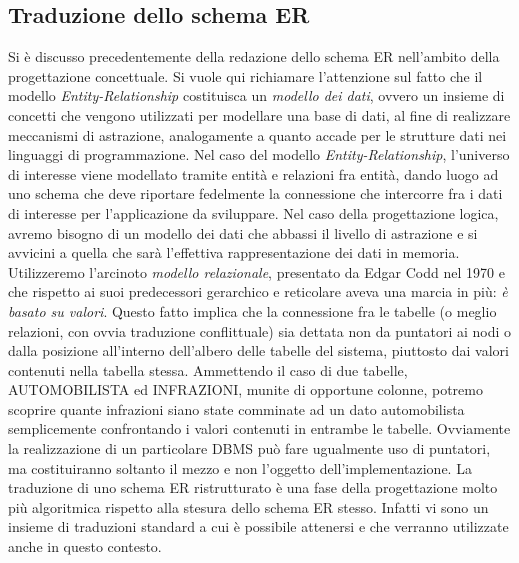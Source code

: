 \documentclass[12pt,a4paper,onecolumn,x11names]{article}
\begin{document}
			

		
\subsection{Traduzione dello schema ER}

	\begin{flushleft}
		Si è discusso precedentemente della redazione dello schema ER nell'ambito della progettazione concettuale. Si vuole qui richiamare l'attenzione sul fatto che il modello \textit{Entity-Relationship} costituisca un \textit{modello dei dati}, ovvero un insieme di concetti che vengono utilizzati per modellare una base di dati, al fine di realizzare meccanismi di astrazione, analogamente a quanto accade per le strutture dati nei linguaggi di programmazione.\newline
		Nel caso del modello \textit{Entity-Relationship}, l'universo di interesse viene modellato tramite entità e relazioni fra entità, dando luogo ad uno schema che deve riportare fedelmente la connessione che intercorre fra i dati di interesse per l'applicazione da sviluppare.\newline
		Nel caso della progettazione logica, avremo bisogno di un modello dei dati che abbassi il livello di astrazione e si avvicini a quella che sarà l'effettiva rappresentazione dei dati in memoria. Utilizzeremo l'arcinoto \textit{modello relazionale}, presentato da Edgar Codd nel 1970 e che rispetto ai suoi predecessori gerarchico e reticolare aveva una marcia in più: \textit{è basato su valori}. Questo fatto implica che la connessione fra le tabelle (o meglio relazioni, con ovvia traduzione conflittuale) sia dettata non da puntatori ai nodi o dalla posizione all'interno dell'albero delle tabelle del sistema, piuttosto dai valori contenuti nella tabella stessa. Ammettendo il caso di due tabelle, \textsf{AUTOMOBILISTA} ed \textsf{INFRAZIONI}, munite di opportune colonne, potremo scoprire quante infrazioni siano state comminate ad un dato automobilista semplicemente confrontando i valori contenuti in entrambe le tabelle. Ovviamente la realizzazione di un particolare DBMS può fare ugualmente uso di puntatori, ma costituiranno soltanto il mezzo e non l'oggetto dell'implementazione.\newline\newline
		La traduzione di uno schema ER ristrutturato è una fase della progettazione molto più algoritmica rispetto alla stesura dello schema ER stesso. Infatti vi sono un insieme di traduzioni standard a cui è possibile attenersi e che verranno utilizzate anche in questo contesto.\newline

\end{flushleft}
\end{document}
